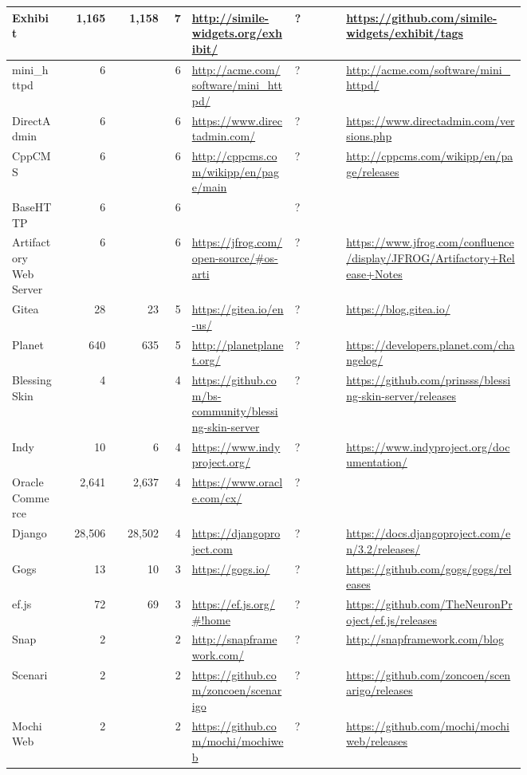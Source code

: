 \begin{landscape}
\begin{longtable}{|p{0.1\linewidth}|r|r|r|p{0.2\linewidth}|p{0.1\linewidth}|p{0.35\linewidth}|}
		Exhibit &1,165 &1,158 &7 &\url{http://simile-widgets.org/exhibit/} &? &\url{https://github.com/simile-widgets/exhibit/tags} \\\hline
		mini\_httpd &6 & &6 &\url{http://acme.com/software/mini\_httpd/} &? &\url{http://acme.com/software/mini\_httpd/} \\\hline
		DirectAdmin &6 & &6 &\url{https://www.directadmin.com/} &? &\url{https://www.directadmin.com/versions.php} \\\hline
		CppCMS &6 & &6 &\url{http://cppcms.com/wikipp/en/page/main} &? &\url{http://cppcms.com/wikipp/en/page/releases} \\\hline
		BaseHTTP &6 & &6 & &? & \\\hline
		Artifactory Web Server &6 & &6 &\url{https://jfrog.com/open-source/\#os-arti} &? &\url{https://www.jfrog.com/confluence/display/JFROG/Artifactory+Release+Notes} \\\hline
		Gitea &28 &23 &5 &\url{https://gitea.io/en-us/} &? &\url{https://blog.gitea.io/} \\\hline
		Planet &640 &635 &5 &\url{http://planetplanet.org/} &? &\url{https://developers.planet.com/changelog/} \\\hline
		Blessing Skin &4 & &4 &\url{https://github.com/bs-community/blessing-skin-server} &? &\url{https://github.com/prinsss/blessing-skin-server/releases} \\\hline
		Indy &10 &6 &4 &\url{https://www.indyproject.org/} &? &\url{https://www.indyproject.org/documentation/} \\\hline
		Oracle Commerce &2,641 &2,637 &4 &\url{https://www.oracle.com/cx/} &? & \\\hline
		Django &28,506 &28,502 &4 &\url{https://djangoproject.com} &? &\url{https://docs.djangoproject.com/en/3.2/releases/} \\\hline
		Gogs &13 &10 &3 &\url{https://gogs.io/} &? &\url{https://github.com/gogs/gogs/releases} \\\hline
		ef.js &72 &69 &3 &\url{https://ef.js.org/\#!home} &? &\url{https://github.com/TheNeuronProject/ef.js/releases} \\\hline
		Snap &2 & &2 &\url{http://snapframework.com/} &? &\url{http://snapframework.com/blog} \\\hline
		Scenari &2 & &2 &\url{https://github.com/zoncoen/scenarigo} &? &\url{https://github.com/zoncoen/scenarigo/releases} \\\hline
		MochiWeb &2 & &2 &\url{https://github.com/mochi/mochiweb} &? &\url{https://github.com/mochi/mochiweb/releases} \\\hline

\end{longtable}
\end{landscape}
